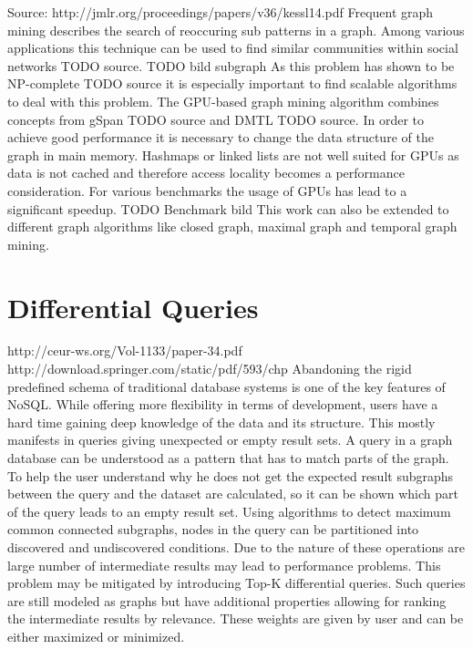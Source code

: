 \documentclass{sig-alternate}
\begin{document}
Source: http://jmlr.org/proceedings/papers/v36/kessl14.pdf
Frequent graph mining describes the search of reoccuring sub patterns 
in a graph. Among various applications this technique can be used to
find similar communities within social networks TODO source.
TODO bild subgraph
As this problem has shown to be NP-complete TODO source it is especially important to
find scalable algorithms to deal with this problem.
The GPU-based graph mining algorithm combines concepts from gSpan TODO source
and DMTL TODO source. In order to achieve good performance it is necessary 
to change the data structure of the graph in main memory. Hashmaps or linked lists
are not well suited for GPUs as data is not cached and therefore access locality becomes 
a performance consideration. 
For various benchmarks the usage of GPUs has lead to a significant speedup.
TODO Benchmark bild
This work can also be extended to different graph algorithms like closed graph,
maximal graph and temporal graph mining.

\section{Differential Queries}
http://ceur-ws.org/Vol-1133/paper-34.pdf
http://download.springer.com/static/pdf/593/chp%
Abandoning the rigid predefined schema of traditional database systems is one of the 
key features of NoSQL. While offering more flexibility in terms of development,
users have a hard time gaining deep knowledge of the data and its structure.
This mostly manifests in queries giving unexpected or empty result sets.
A query in a graph database can be understood as a pattern that has to match parts of the graph.
To help the user understand why he does not get the expected result subgraphs between the
query and the dataset are calculated, so it can be shown which part of the query leads to an empty result set.
Using algorithms to detect maximum common connected subgraphs, nodes in the query can be 
partitioned into discovered and undiscovered conditions.
Due to the nature of these operations are large number of intermediate results 
may lead to performance problems.
This problem may be mitigated by introducing Top-K differential queries. 
Such queries are still modeled as graphs but have additional properties allowing for ranking
the intermediate results by relevance. These weights are given by user and can be either maximized or minimized.
\end{document}
